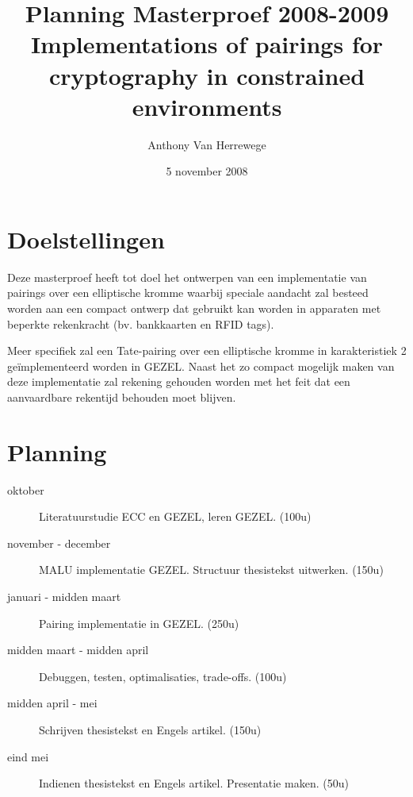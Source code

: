 \documentclass[a4paper]{article}
\title{\LARGE Planning Masterproef 2008-2009\\\Large Implementations of pairings for cryptography in constrained environments}
\author{Anthony Van Herrewege}
\date{5 november 2008}
\begin{document}
\maketitle

\section*{Doelstellingen}

Deze masterproef heeft tot doel het ontwerpen van een implementatie van pairings over een elliptische kromme waarbij speciale aandacht zal besteed worden aan een compact ontwerp dat gebruikt kan worden in apparaten met beperkte rekenkracht (bv. bankkaarten en RFID tags).

Meer specifiek zal een Tate-pairing over een elliptische kromme in karakteristiek 2 ge\"implementeerd worden in GEZEL. Naast het zo compact mogelijk maken van deze implementatie zal rekening gehouden worden met het feit dat een aanvaardbare rekentijd behouden moet blijven.

\section*{Planning}

\begin{description}
	\item[oktober] Literatuurstudie ECC en GEZEL, leren GEZEL. (100u)
	\item[november - december] MALU implementatie GEZEL. Structuur thesistekst uitwerken. (150u)
	\item[januari - midden maart] Pairing implementatie in GEZEL. (250u)
	\item[midden maart - midden april] Debuggen, testen, optimalisaties, trade-offs. (100u)
	\item[midden april - mei] Schrijven thesistekst en Engels artikel. (150u)
	\item[eind mei] Indienen thesistekst en Engels artikel. Presentatie maken. (50u)
\end{description}
\end{document}
